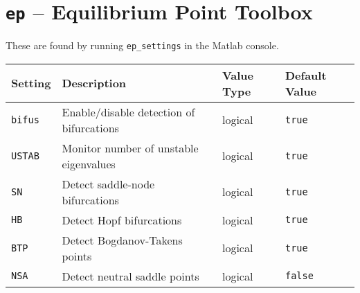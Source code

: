 \documentclass[11pt]{article}
\begin{document}
\section*{\texttt{ep} -- Equilibrium Point Toolbox}

These are found by running \verb!ep_settings! in the Matlab console.

\begin{table}[h]
  \centering
  \begin{tabular}{l|l|l|l}
    \textbf{Setting} & \textbf{Description}                     & \textbf{Value Type} & \textbf{Default Value} \\[1ex] \hline
    \verb!bifus!     & Enable/disable detection of bifurcations & logical             & \verb!true!            \\[1ex]
    \verb!USTAB!     & Monitor number of unstable  eigenvalues  & logical             & \verb!true!            \\[1ex]
    \verb!SN!        & Detect saddle-node bifurcations          & logical             & \verb!true!            \\[1ex]
    \verb!HB!        & Detect Hopf bifurcations                 & logical             & \verb!true!            \\[1ex]
    \verb!BTP!       & Detect Bogdanov-Takens points            & logical             & \verb!true!            \\[1ex]
    \verb!NSA!       & Detect neutral saddle points             & logical             & \verb!false!
  \end{tabular}
\end{table}

\end{document}
